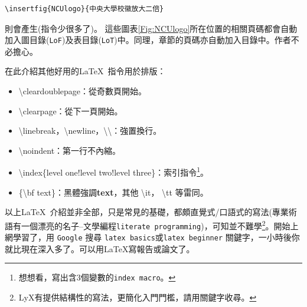  
\begin{Verbatim}[frame=single,firstline=1,label={Macro usage}]
\insertfig{NCUlogo}{中央大學校徽放大二倍}
\end{Verbatim}
則會產生(指令少很多了)。
這些圖表\ref{Fig:NCUlogo}所在位置的相關頁碼都會自動加入圖目錄({\tt LoF})及表目錄({\tt LoT})中。同理，章節的頁碼亦自動加入目錄中。作者不必擔心。

在此介紹其他好用的\LaTeX\ 指令用於排版：
\begin{itemize}
\item \textbackslash cleardoublepage：從奇數頁開始。 
\item \textbackslash clearpage：從下一頁開始。       
\item \textbackslash linebreak，\textbackslash newline，\textbackslash\textbackslash：強置換行。  
\item \textbackslash noindent：第一行不內縮。        
\item \textbackslash index\{level one!level two!level three\}：索引指令\footnote{想想看，寫出含3個變數的{\tt index macro}。}。
\item \{\textbackslash bf text\}：黑體強調{\bf text}，其他 \textbackslash it， \textbackslash tt 等雷同。
\end{itemize}
以上\LaTeX\ 介紹並非全部，只是常見的基礎，都頗直覺式/口語式的寫法(專業術語有一個漂亮的名子--文學編程{\tt literate programming})，可知並不難學\footnote{LyX有提供結構性的寫法，更簡化入門門檻，請用關鍵字收尋。}。開始上網學習了，用 {\tt Google} 搜尋 {\tt latex basics}或{\tt latex beginner} 關鍵字，一小時後你就比現在深入多了。可以用\LaTeX{}寫報告或論文了。 
